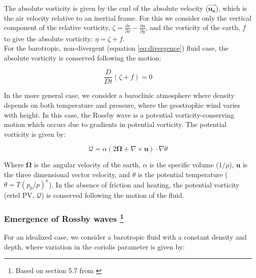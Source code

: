 \documentclass{article}
\begin{document}
The absolute vorticity is given by the curl of the absolute velocity ($\mathbf{\vec{u_a}}$), which is the air velocity relative to an inertial frame. For this we consider only the vertical component of the relative vorticity, $\zeta = \frac{\partial v}{\partial x} - \frac{\partial u}{\partial y}$, and the vorticity of the earth, $f$ to give the absolute vorticity: $\eta = \zeta + f$.\\

For the barotropic, non-divergent (equation \ref{eq:divergence}) fluid case, the absolute vorticity is conserved following the motion:

\begin{equation}
    \frac{D}{Dt}(\zeta + f) = 0
    \label{eq:conservation_of_absolute_vorticity}
\end{equation}


In the more general case, we consider a baroclinic atmosphere where density depends on both temperature and pressure, where the geostrophic wind varies with height. In this case, the Rossby wave is a potential vorticity-conserving motion which occurs due to gradients in potential vorticity. The potential vorticity is given by:

\begin{equation}
    \mathcal{Q} = \alpha (2 \mathbf{\Omega} + \nabla \times \mathbf{u}) \cdot \nabla \theta
    \label{eq:potential_vorticity}
\end{equation}

Where $\mathbf{\Omega}$ is the angular velocity of the earth, $\alpha$ is the specific volume ($1/\rho$), $\mathbf{u}$ is the three dimensional vector velocity, and $\theta$ is the potential temperature ($\theta = T (p_0/p)^{\kappa}$). In the absence of friction and heating, the potential vorticity (ertel PV, $\mathcal{Q}$) is conserved following the motion of the fluid.\\

\subsubsection*{Emergence of Rossby waves \footnote[1]{Based on section 5.7 from \parencite{holton_introduction_2013}}}

For an idealized case, we consider a barotropic fluid with a constant density and depth, where variation in the coriolis parameter is given by:
\end{document}
